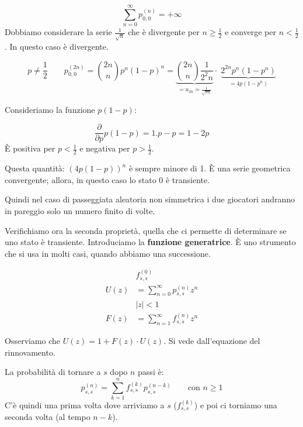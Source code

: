 \documentclass[a4paper,12pt]{book}
\begin{document}
$$ \sum_{n=0}^{\infty} p_{0,0}^{(n)} = +\infty $$
Dobbiamo considerare la serie $\frac{1}{\sqrt{n}}$ che è divergente per $ n \ge \frac{1}{2} $ e converge per $ n < \frac{1}{2} $. In questo caso è divergente. 

$$ p \ne \frac{1}{2} \qquad p_{0,0}^{(2n)} = \binom{2n}{n} p^n (1-p)^n = \underbrace{\binom{2n}{n}\frac{1}{2^2n}}_{\displaystyle = u_{2n} \simeq \frac{1}{\sqrt{\pi n}}} \cdot \; \underbrace{2^{2n} p^n(1-p^n) }_{\displaystyle = 4p(1-p^n)} $$

Consideriamo la funzione $ p(1-p) $:

$$ \frac{\partial}{\partial{p}} p(1-p) = 1.p -p = 1 - 2p $$
È positiva per $ p < \frac{1}{2} $ e negativa per $ p > \frac{1}{2} $.

\begin{multicols}{2}
	
	Questa quantità: $ (4p(1-p))^n $ è sempre minore di 1. È una serie geometrica convergente; allora, in questo caso lo stato 0 è transiente. 
\end{multicols}

Quindi nel caso di passeggiata aleatoria non simmetrica i due giocatori andranno in pareggio solo un numero finito di volte. 

Verifichiamo ora la seconda proprietà, quella che ci permette di determinare se uno stato è transiente. Introduciamo la \textbf{funzione generatrice}. È uno strumento che si usa in molti casi, quando abbiamo una successione. 

\begin{align*}
	& f_{s,s}^{(0)} \\
	U(z) & = \sum_{n=0}^{\infty} p_{s,s}^{(n)} z^n \\
	& |z| < 1 \\
	F(z) & = \sum_{n=1}^{\infty} f_{s,s}^{(n)} z^n
\end{align*}

Osserviamo che $ U(z) = 1 + F(z)\cdot U(z) $. Si vede dall'equazione del rinnovamento. 

La probabilità di tornare a $ s $ dopo $ n $ passi è:
$$ p_{s,s}^{(n)} = \sum_{k=1}^{n} f_{s,s}^{(k)} p_{s,s}^{(n-k)} \qquad \text{con } n \ge 1 $$
C'è quindi una prima volta dove arriviamo a $ s $ ($ f_{s,s}^{(k)} $) e poi ci torniamo una seconda volta (al tempo $ n-k $). 
\end{document}

